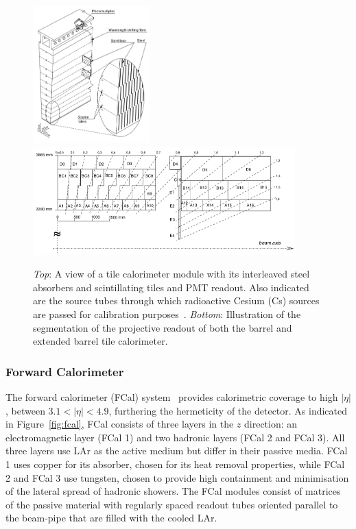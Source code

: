 \begin{figure}[!htb]
    \begin{center}
        \includegraphics[width=0.4\textwidth]{figures/chapter2/calorimeters/atlas_tile_module}
        \includegraphics[width=0.9\textwidth]{figures/chapter2/calorimeters/atlas_tile_plan_view}
        \caption{
            \textit{Top}: A view of a tile calorimeter module with its interleaved steel
                absorbers and scintillating tiles and PMT readout. Also indicated are the source tubes
                through which radioactive Cesium (Cs) sources are passed for calibration purposes~\cite{Marjanovic:2018ohl}.
            \textit{Bottom}: Illustration of the segmentation of the projective readout of
                both the barrel and extended barrel tile calorimeter.
        }
        \label{fig:tile_calo}
    \end{center}
\end{figure}

\FloatBarrier
\subsubsection{Forward Calorimeter}
\label{sec:calo_forward}

The forward calorimeter (FCal) system~\cite{Artamonov_2008} provides calorimetric coverage to
high $\lvert \eta \rvert$, between $3.1 < \lvert \eta \rvert < 4.9$,
furthering the hermeticity of the detector.
As indicated in Figure~\ref{fig:fcal}, FCal consists of three layers in the
$z$ direction: an electromagnetic layer (FCal 1) and two hadronic layers (FCal 2 and FCal 3).
All three layers use LAr as the active medium but differ in their passive media.
FCal 1 uses copper for its absorber, chosen for its heat removal properties,
while FCal 2 and FCal 3 use tungsten, chosen to provide high containment and
minimisation of the lateral spread of hadronic showers.
The FCal modules consist of matrices of the passive material with regularly
spaced readout tubes  oriented parallel to the beam-pipe that are filled with the cooled LAr.

